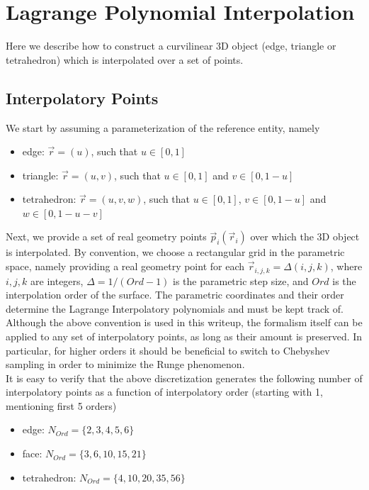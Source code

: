 \section{Lagrange Polynomial Interpolation}

Here we describe how to construct a curvilinear 3D object (edge, triangle or tetrahedron) which is interpolated over a set of points. \\

\subsection{Interpolatory Points}

\noindent
We start by assuming a parameterization of the reference entity, namely
\begin{itemize}
	\item edge:			$\vec{r}=(u)$,		such that $u \in [0,1]$
	\item triangle: 	$\vec{r}=(u,v)$,	such that $u \in [0,1]$ and $v \in [0, 1-u]$
	\item tetrahedron:	$\vec{r}=(u,v,w)$,	such that $u \in [0,1]$, $v \in [0, 1-u]$ and $w \in [0, 1-u-v]$ 
\end{itemize}

\noindent
Next, we provide a set of real geometry points $\vec{p}_i(\vec{r}_i)$ over which the 3D object is interpolated. By convention, we choose a rectangular grid in the parametric space, namely providing a real geometry point for each $\vec{r}_{i,j,k} = \Delta (i,j,k)$, where $i,j,k$ are integers, $\Delta = 1 / (Ord - 1)$ is the parametric step size, and $Ord$ is the interpolation order of the surface. The parametric coordinates and their order determine the Lagrange Interpolatory polynomials and must be kept track of. Although the above convention is used in this writeup, the formalism itself can be applied to any set of interpolatory points, as long as their amount is preserved. In particular, for higher orders it should be beneficial to switch to Chebyshev sampling in order to minimize the Runge phenomenon. \\

\noindent
It is easy to verify that the above discretization generates the following number of interpolatory points as a function of interpolatory order (starting with 1, mentioning first 5 orders)
\begin{itemize}
	\item edge:			$N_{Ord} = \{ 2,3,4,5,6 \}  $
	\item face:			$N_{Ord} = \{ 3,6,10,15,21 \}  $
	\item tetrahedron:	$N_{Ord} = \{ 4,10,20,35,56 \}  $
\end{itemize}

